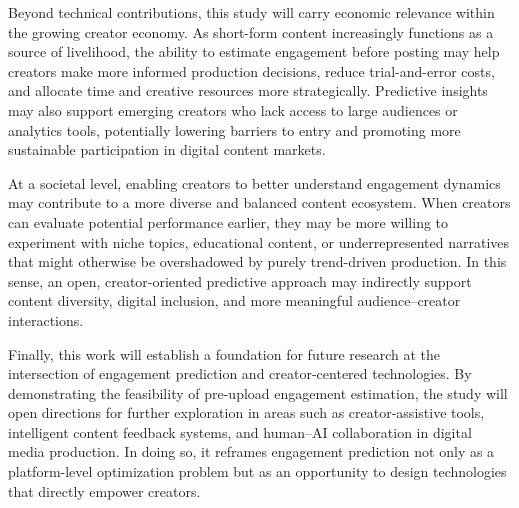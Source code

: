 Beyond technical contributions, this study will carry economic relevance within the growing creator economy. As short-form content increasingly functions as a source of livelihood, the ability to estimate engagement before posting may help creators make more informed production decisions, reduce trial-and-error costs, and allocate time and creative resources more strategically. Predictive insights may also support emerging creators who lack access to large audiences or analytics tools, potentially lowering barriers to entry and promoting more sustainable participation in digital content markets.

At a societal level, enabling creators to better understand engagement dynamics may contribute to a more diverse and balanced content ecosystem. When creators can evaluate potential performance earlier, they may be more willing to experiment with niche topics, educational content, or underrepresented narratives that might otherwise be overshadowed by purely trend-driven production. In this sense, an open, creator-oriented predictive approach may indirectly support content diversity, digital inclusion, and more meaningful audience–creator interactions.

Finally, this work will establish a foundation for future research at the intersection of engagement prediction and creator-centered technologies. By demonstrating the feasibility of pre-upload engagement estimation, the study will open directions for further exploration in areas such as creator-assistive tools, intelligent content feedback systems, and human--AI collaboration in digital media production. In doing so, it reframes engagement prediction not only as a platform-level optimization problem but as an opportunity to design technologies that directly empower creators.






